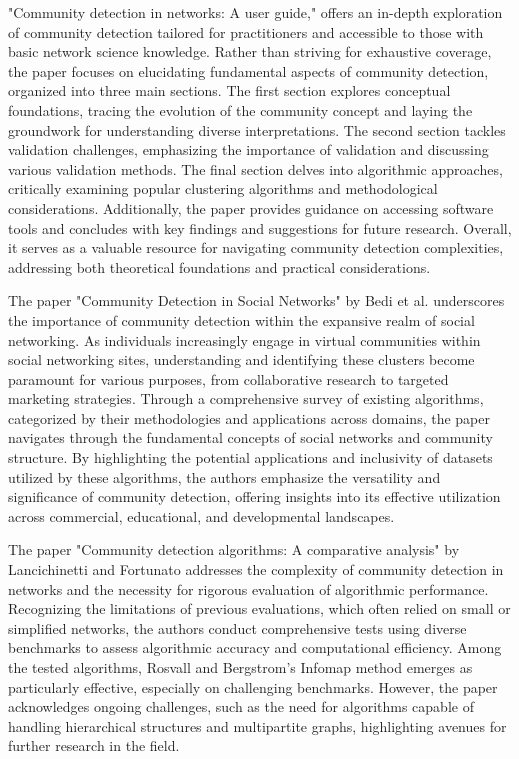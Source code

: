 "Community detection in networks: A user guide," \cite{cd_in_networks_Fortunato} offers an in-depth exploration of community detection tailored for practitioners and accessible to those with basic network science knowledge. Rather than striving for exhaustive coverage, the paper focuses on elucidating fundamental aspects of community detection, organized into three main sections. The first section explores conceptual foundations, tracing the evolution of the community concept and laying the groundwork for understanding diverse interpretations. The second section tackles validation challenges, emphasizing the importance of validation and discussing various validation methods. The final section delves into algorithmic approaches, critically examining popular clustering algorithms and methodological considerations. Additionally, the paper provides guidance on accessing software tools and concludes with key findings and suggestions for future research. Overall, it serves as a valuable resource for navigating community detection complexities, addressing both theoretical foundations and practical considerations.

The paper "Community Detection in Social Networks" by Bedi et al. \cite{cd_in_social_networks_Bedi} underscores the importance of community detection within the expansive realm of social networking. As individuals increasingly engage in virtual communities within social networking sites, understanding and identifying these clusters become paramount for various purposes, from collaborative research to targeted marketing strategies. Through a comprehensive survey of existing algorithms, categorized by their methodologies and applications across domains, the paper navigates through the fundamental concepts of social networks and community structure. By highlighting the potential applications and inclusivity of datasets utilized by these algorithms, the authors emphasize the versatility and significance of community detection, offering insights into its effective utilization across commercial, educational, and developmental landscapes.

The paper "Community detection algorithms: A comparative analysis" by Lancichinetti and Fortunato \cite{cda_comp_analysis_Fortunato} addresses the complexity of community detection in networks and the necessity for rigorous evaluation of algorithmic performance. Recognizing the limitations of previous evaluations, which often relied on small or simplified networks, the authors conduct comprehensive tests using diverse benchmarks to assess algorithmic accuracy and computational efficiency. Among the tested algorithms, Rosvall and Bergstrom's Infomap method emerges as particularly effective, especially on challenging benchmarks. However, the paper acknowledges ongoing challenges, such as the need for algorithms capable of handling hierarchical structures and multipartite graphs, highlighting avenues for further research in the field.
